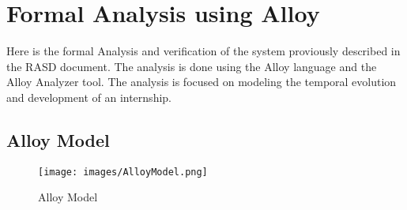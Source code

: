 \chapter{Formal Analysis using Alloy}%
\label{chap:Formal-Analysis-using-Alloy}%

\par Here is the formal Analysis and verification of the system proviously described in the RASD document. The analysis is done using the Alloy language and the Alloy Analyzer tool.
The analysis is focused on modeling the temporal evolution and development of an internship.

\section{Alloy Model}%
\label{sec:Alloy-Model}%

\begin{figure}
    \centering
    \texttt{[image: images/AlloyModel.png]}
    \caption{Alloy Model}
    \label{fig:AlloyModel}
\end{figure}